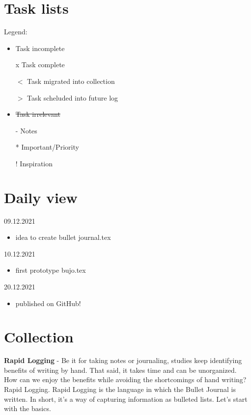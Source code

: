 \documentclass[a5paper,11pt]{article}
\begin{document}
\section*{Task lists}
Legend:
\begin{itemize}
	\item Task incomplete
	\item[x] Task complete 
	\item[$<$] Task migrated into collection
	\item[$>$] Task scheluded into future log
	\item \sout{Task irrelevant} %
	\item[-] Notes
	\item[*] Important/Priority
	\item[!] Inspiration
\end{itemize}
\newpage
\section*{Daily view}
09.12.2021
\begin{itemize}
	\item idea to create bullet journal.tex
\end{itemize}
10.12.2021
\begin{itemize}
	\item first prototype bujo.tex
\end{itemize}
20.12.2021
\begin{itemize}
	\item published on GitHub!
\end{itemize}
\newpage
\section*{Collection}
\textbf{Rapid Logging} - Be it for taking notes or journaling, studies keep identifying benefits of writing by hand. That said, it takes time and can be unorganized. How can we enjoy the benefits while avoiding the shortcomings of hand writing? Rapid Logging. Rapid Logging is the language in which the Bullet Journal is written. In short, it's a way of capturing information as bulleted lists. Let's start with the basics.
\end{document}

